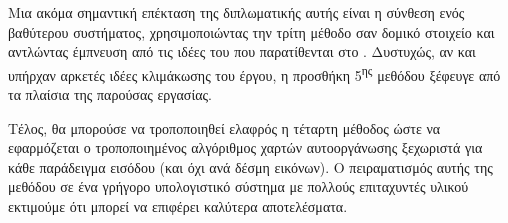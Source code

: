 Μια ακόμα σημαντική επέκταση της διπλωματικής αυτής είναι η σύνθεση ενός βαθύτερου συστήματος, χρησιμοποιώντας την τρίτη μέθοδο σαν δομικό στοιχείο και αντλώντας έμπνευση από τις ιδέες του  που παρατίθενται στο \cite{hinton2021represent_GLOM}. Δυστυχώς, αν και υπήρχαν αρκετές ιδέες κλιμάκωσης του έργου, η προσθήκη 5\textsuperscript{ης} μεθόδου ξέφευγε από τα πλαίσια της παρούσας εργασίας.\par

Τέλος, θα μπορούσε να τροποποιηθεί ελαφρός η τέταρτη μέθοδος ώστε να εφαρμόζεται ο τροποποιημένος αλγόριθμος χαρτών αυτο\textendash οργάνωσης ξεχωριστά για κάθε παράδειγμα εισόδου (και όχι ανά δέσμη εικόνων). Ο πειραματισμός αυτής της μεθόδου σε ένα γρήγορο υπολογιστικό σύστημα με πολλούς επιταχυντές υλικού εκτιμούμε ότι μπορεί να επιφέρει καλύτερα αποτελέσματα.